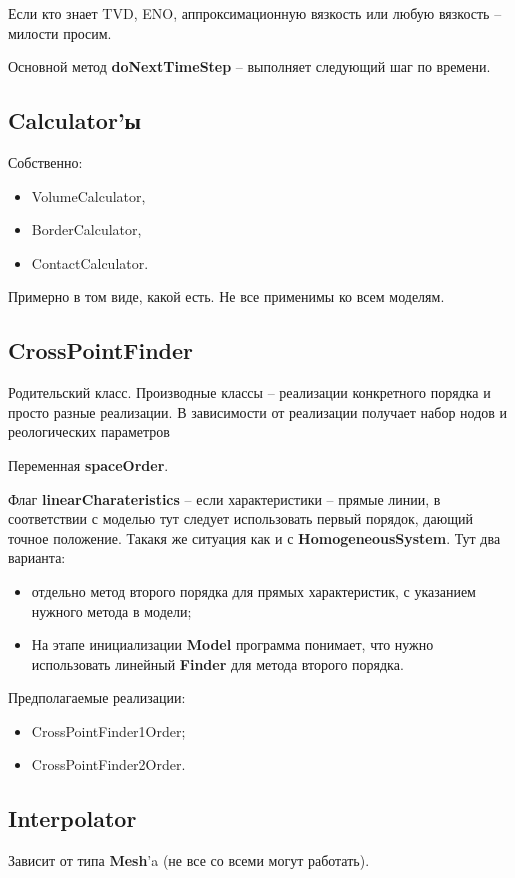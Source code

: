 \documentclass[a4paper,12pt]{article}
\numberwithin{equation}{section}
\begin{document}
	Если кто знает TVD, ENO, аппроксимационную вязкость или любую вязкость -- милости просим.
	
	Основной метод \textbf{doNextTimeStep} -- выполняет следующий шаг по времени.

\subsection{Calculator'ы}
	Собственно:
	\begin{itemize}
		\item{VolumeCalculator,}
		\item{BorderCalculator,}
		\item{ContactCalculator.}
	\end{itemize}
	Примерно в том виде, какой есть. Не все применимы ко всем моделям.

\subsection{CrossPointFinder}
	Родительский класс. Производные классы -- реализации конкретного порядка и просто разные реализации.
	В зависимости от реализации получает набор нодов и реологических параметров
	
	Переменная \textbf{spaceOrder}.
	
	Флаг \textbf{linearCharateristics} -- если характеристики -- прямые линии, в соответствии с моделью тут следует использовать первый порядок, дающий точное положение. Такакя же ситуация как и с \textbf{HomogeneousSystem}.
	Тут два варианта: 
		\begin{itemize}
			\item{отдельно метод второго порядка для прямых характеристик, с указанием нужного метода в модели;}
			\item{На этапе инициализации \textbf{Model} программа понимает, что нужно использовать линейный \textbf{Finder} для метода второго порядка.}
		\end{itemize}

	Предполагаемые реализации:
		\begin{itemize}
			\item{CrossPointFinder1Order;}
			\item{CrossPointFinder2Order.}
		\end{itemize}

\subsection{Interpolator}
	Зависит от типа \textbf{Mesh}'a (не все со всеми могут работать).
	
\end{document}
